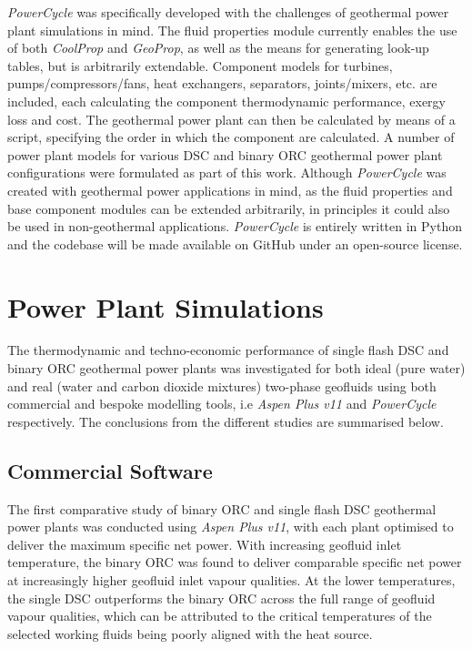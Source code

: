    \emph{PowerCycle} was specifically developed with the challenges of geothermal power plant simulations in mind. The fluid properties module currently enables the use of both \emph{CoolProp} and \emph{GeoProp}, as well as the means for generating look-up tables, but is arbitrarily extendable. Component models for turbines, pumps/compressors/fans, heat exchangers, separators, joints/mixers, etc. are included, each calculating the component thermodynamic performance, exergy loss and cost. The geothermal power plant can then be calculated by means of a script, specifying the order in which the component are calculated. A number of power plant models for various \ac{DSC} and binary \ac{ORC} geothermal power plant configurations were formulated as part of this work. Although \emph{PowerCycle} was created with geothermal power applications in mind, as the fluid properties and base component modules can be extended arbitrarily, in principles it could also be used in non-geothermal applications. \emph{PowerCycle} is entirely written in Python and the codebase will be made available on GitHub under an open-source license.
    
\section{Power Plant Simulations}
    The thermodynamic and techno-economic performance of single flash \ac{DSC} and binary \ac{ORC} geothermal power plants was investigated for both ideal (pure water) and real (water and carbon dioxide mixtures) two-phase geofluids using both commercial and bespoke modelling tools, i.e \emph{Aspen Plus v11} and \emph{PowerCycle} respectively. The conclusions from the different studies are summarised below.

    \subsection{Commercial Software}
        The first comparative study of binary \ac{ORC} and single flash \ac{DSC} geothermal power plants was conducted using \emph{Aspen Plus v11}, with each plant optimised to deliver the maximum specific net power. With increasing geofluid inlet temperature, the binary \ac{ORC} was found to deliver comparable specific net power at increasingly higher geofluid inlet vapour qualities. At the lower temperatures, the single \ac{DSC} outperforms the binary \ac{ORC} across the full range of geofluid vapour qualities, which can be attributed to the critical temperatures of the selected working fluids being poorly aligned with the heat source.

